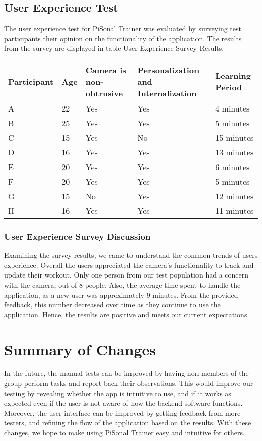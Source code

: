 \documentclass{article}
\begin{document}
\subsection{User Experience Test}
The user experience test for PiSonal Trainer was evaluated by surveying test participants their opinion on the functionality of the application. The results from the survey are displayed in table User Experience Survey Results. 

\begingroup
\begin{tabular}{ | p{2cm} | p{2cm} | p{3cm} | p{3cm} | p{3cm} |} 
    \hline
    \textbf{Participant} &\textbf{Age}& \textbf{Camera is non-obtrusive} & \textbf{Personalization and Internalization} & \textbf{Learning Period}\\
    \hline
    A & 22 & Yes & Yes  & 4 minutes\\
    \hline
    B & 25 & Yes & Yes  & 5 minutes\\
    \hline
    C & 15 & Yes & No  & 15 minutes\\
    \hline
    D & 16 & Yes & Yes  & 13 minutes\\
    \hline
    E & 20 & Yes & Yes  & 6 minutes\\
    \hline
    F & 20 & Yes & Yes  & 5 minutes\\
    \hline
    G & 15 & No & Yes  & 12 minutes\\
    \hline
    H & 16 & Yes & Yes  & 11 minutes\\
    \hline
\end{tabular}
\endgroup

\subsubsection{User Experience Survey Discussion}
Examining the survey results, we came to understand the common trends of users experience. Overall the users appreciated the camera’s functionality to track and update their workout. Only one person from our test population had a concern with the camera, out of 8 people. Also, the average time spent to handle the application, as a new user was approximately 9 minutes. From the provided feedback, this number decreased over time as they continue to use the application. Hence, the results are positive and meets our current expectations. 

\section{Summary of Changes}
In the future, the manual tests can be improved by having non-members of the group perform tasks and report back their observations. This would improve our testing by revealing whether the app is intuitive to use, and if it works as expected even if the user is not aware of how the backend software functions. Moreover, the user interface can be improved by getting feedback from more testers, and refining the flow of the application based on the results. With these changes, we hope to make using PiSonal Trainer easy and intuitive for others.
\end{document}
